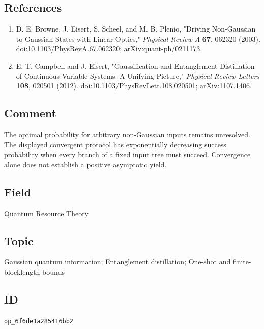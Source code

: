 \subsection*{References}

\begin{enumerate}[label={},leftmargin=4.8em,labelsep=0.5em]
  \footnotesize
  \item[\textup{[BESP03]}]\label{ref:ser18-1}
  D. E. Browne, J. Eisert, S. Scheel, and M. B. Plenio, "Driving Non-Gaussian to Gaussian States with Linear Optics," \emph{Physical Review A} \textbf{67}, 062320 (2003). \href{https://doi.org/10.1103/PhysRevA.67.062320}{doi:10.1103/PhysRevA.67.062320}; \href{https://arxiv.org/abs/quant-ph/0211173}{arXiv:quant-ph/0211173}.

  \item[\textup{[CE12]}]\label{ref:ser18-2}
  E. T. Campbell and J. Eisert, "Gaussification and Entanglement Distillation of Continuous Variable Systems: A Unifying Picture," \emph{Physical Review Letters} \textbf{108}, 020501 (2012). \href{https://doi.org/10.1103/PhysRevLett.108.020501}{doi:10.1103/PhysRevLett.108.020501}; \href{https://arxiv.org/abs/1107.1406}{arXiv:1107.1406}.
\end{enumerate}

\subsection*{Comment}

The optimal probability for arbitrary non-Gaussian inputs remains unresolved. The displayed convergent protocol has exponentially decreasing success probability when every branch of a fixed input tree must succeed. Convergence alone does not establish a positive asymptotic yield.

\subsection*{Field}

Quantum Resource Theory

\subsection*{Topic}

Gaussian quantum information; Entanglement distillation; One-shot and finite-blocklength bounds

\subsection*{ID}

\texttt{op\_6f6de1a285416bb2}
